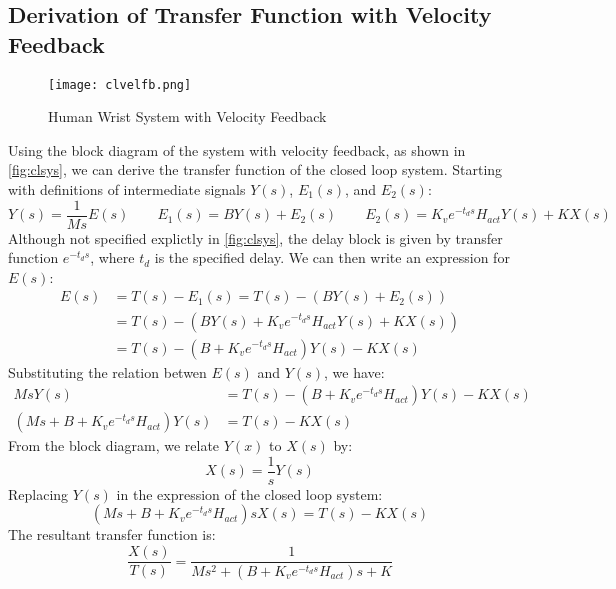 \documentclass[11pt,a4paper]{article}
\begin{document}
\subsection{Derivation of Transfer Function with Velocity Feedback}
\begin{figure}
    \centering
    \texttt{[image: clvelfb.png]}
    \caption{Human Wrist System with Velocity Feedback}
    \label{fig:clsys}
\end{figure}
Using the block diagram of the system with velocity feedback, as shown in
\autoref{fig:clsys}, we can derive the transfer function of the closed loop
system. Starting with definitions of intermediate signals $Y(s)$, $E_1(s)$, and
$E_2(s)$:
\begin{equation*}
    Y(s) = \frac{1}{Ms}E(s) \qquad E_1(s) = BY(s) + E_2(s) \qquad
    E_2(s) = K_v e^{-t_d s} H_{act} Y(s) + KX(s)
\end{equation*}
Although not specified explictly in \autoref{fig:clsys}, the delay block is
given by transfer function $ e^{-t_d s} $, where $t_d$ is the specified delay.
We can then write an expression for $E(s)$:
\begin{align*}
    E(s) &= T(s) - E_1(s) = T(s) - (BY(s) + E_2(s)) \\
         &= T(s) - (BY(s) + K_v e^{-t_d s} H_{act} Y(s) + KX(s)) \\
         &= T(s) - (B + K_v e^{-t_d s} H_{act}) Y(s) - KX(s)
\end{align*}
Substituting the relation betwen $E(s)$ and $Y(s)$, we have:
\begin{align*}
    Ms Y(s) &= T(s) - (B + K_v e^{-t_d s} H_{act}) Y(s) - KX(s) \\
    (Ms + B + K_v e^{-t_d s} H_{act}) Y(s) &= T(s) - KX(s)
\end{align*}
From the block diagram, we relate $Y(x)$ to $X(s)$ by:
\begin{equation*}
    X(s) = \frac{1}{s} Y(s)
\end{equation*}
Replacing $Y(s)$ in the expression of the closed loop system:
\begin{equation*}
    (Ms + B + K_v e^{-t_d s} H_{act}) s X(s) = T(s) - KX(s)
\end{equation*}
The resultant transfer function is:
\begin{equation*}
    \frac{X(s)}{T(s)} = \frac{1}{Ms^2 + (B + K_v e^{-t_d s} H_{act}) s  + K}
\end{equation*}

\end{document}
